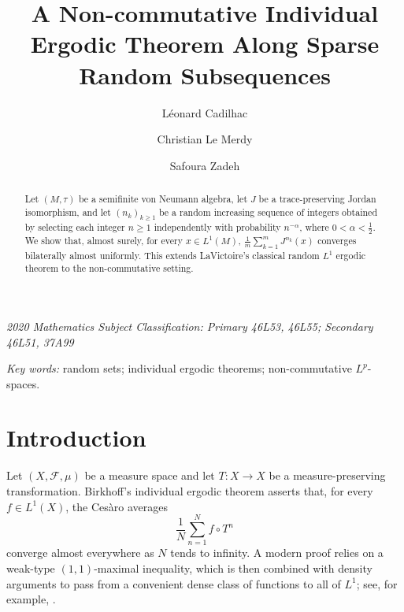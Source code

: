 \documentclass[12pt]{amsart}
\author{Léonard Cadilhac}
\author[C. Le Merdy]{Christian Le Merdy}
\author[S. Zadeh]{Safoura Zadeh}
\theoremstyle{remark}
\theoremstyle{definition}
\numberwithin{equation}{section}
\begin{document}
\title[Random ergodic averages]{A Non-commutative Individual Ergodic Theorem Along Sparse Random Subsequences}




\begin{abstract}
Let $(M,\tau)$ be a semifinite von Neumann algebra, let $J$ be a 
trace-preserving Jordan isomorphism, and let $(n_k)_{k\geq 1}$ be a random increasing sequence of integers obtained by selecting each integer $n\geq 1$
independently with probability $n^{-\alpha}$, where $0<\alpha<\frac12$. We show that, almost surely, for every $x\in L^1(M)$,
\(
   \frac1m\sum_{k=1}^m J^{n_k}(x)
\)
converges bilaterally almost uniformly. This extends LaVictoire's classical random $L^1$ ergodic theorem to the non-commutative setting. 
\end{abstract}

\maketitle


\noindent
{\it 2020 Mathematics Subject Classification: Primary 46L53, 46L55; Secondary 46L51, 37A99}


\smallskip
\noindent
{\it Key words:}  random sets; individual ergodic theorems; non-commutative \(L^p\)-spaces.






\bigskip
\section{Introduction}\label{1}
Let $(X,\mathcal F,\mu)$ be a measure space and let $T\colon
X\to X$ be a
measure-preserving transformation. Birkhoff's individual ergodic theorem
asserts that, for every $f\in L^1(X)$, the Ces\`aro averages
\[
   \frac{1}{N}\sum_{n=1}^N f\circ T^n
\]
converge almost everywhere as $N$ tends to infinity. A modern proof relies on
a weak-type $(1,1)$-maximal inequality, which is then combined with density
arguments to pass from a convenient dense class of functions to all of
$L^1$; see, for example, \cite[Chapter~1]{Kren}.
\end{document}
